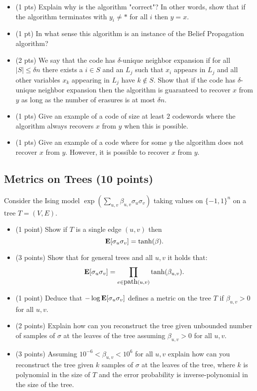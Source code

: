 \documentclass[11pt]{article} \usepackage{amssymb}
\newcommand{\E}{{\bf E}} \newcommand{\Cov}{{\bf Cov}}
\begin{document}
\begin{itemize}
\item (1 pts) Explain why is the algorithm "correct"? In other words,
  show that if the algorithm terminates with $y_i \neq *$ for all $i$
  then $y=x$.
\item (1 pt) In what sense this algorithm is an instance of the Belief
  Propagation algorithm?
\item (2 pts) We say that the code has $\delta$-unique neighbor
  expansion if for all $|S| \leq \delta n$ there exists a $i \in S$
  and an $L_j$ such that $x_i$ appears in $L_j$ and all other
  variables $x_k$ appearing in $L_j$ have $k \notin S$.  Show that if
  the code has $\delta$-unique neighbor expansion then the algorithm
  is guaranteed to recover $x$ from $y$ as long as the number of
  erasures is at most $\delta n$.
\item (1 pts) Give an example of a code of size at least $2$ codewords
  where the algorithm always recovers $x$ from $y$ when this is
  possible.
\item (1 pts) Give an example of a code where for some $y$ the
  algorithm does not recover $x$ from $y$. However, it is possible to
  recover $x$ from $y$.
\end{itemize}


\subsection{Metrics on Trees (10 points)}
Consider the Ising model $\exp(\sum_{u,v} \beta_{u,v} \sigma_u \sigma_v)$ taking values on $\{-1,1\}^n$ on a tree $T=(V,E)$.
\begin{itemize}
\item (1 point)
Show if $T$ is a single edge $(u,v)$ then
\[
\E[\sigma_u \sigma_v] = \tanh(\beta).
\]
\item (3 points)
Show that for general trees and all $u,v$ it holds that:
\[
\E[\sigma_u \sigma_v] = \prod_{e \in \mbox{path}(u,v)} \tanh(\beta_{u,v}).
\]
\item (1 point)
Deduce that $-\log \E[\sigma_u \sigma_v]$ defines a metric on the tree $T$ if $\beta_{u,v} > 0$ for all $u,v$.
\item (2 points)
Explain how can you reconstruct the tree given unbounded number of samples of $\sigma$ at the leaves of the tree assuming $\beta_{u,v} > 0$ for all $u,v$. 
\item  (3 points)
Assuming $10^{-6} < \beta_{u,v} < 10^6$ for all $u,v$ explain how can you reconstruct the tree given $k$ samples of $\sigma$ at the leaves of the tree, where $k$ is polynomial in the size of $T$ and the error probability is inverse-polynomial in the size of the tree. 
\end{itemize}
\end{document}
